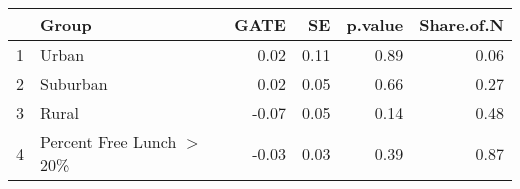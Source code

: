\begin{tabular}{rlrrrr}
  \hline
 & Group & GATE & SE & p.value & Share.of.N \\ 
  \hline
1 & Urban & 0.02 & 0.11 & 0.89 & 0.06 \\ 
  2 & Suburban & 0.02 & 0.05 & 0.66 & 0.27 \\ 
  3 & Rural & -0.07 & 0.05 & 0.14 & 0.48 \\ 
  4 & Percent Free Lunch $>$ 20\% & -0.03 & 0.03 & 0.39 & 0.87 \\ 
   \hline
\end{tabular}
